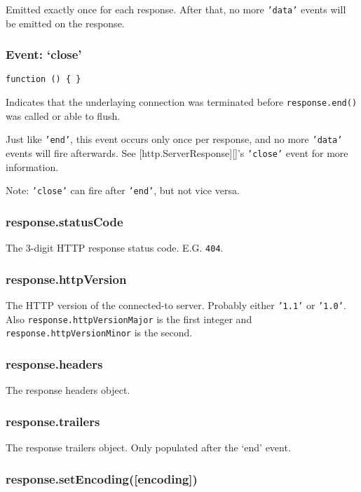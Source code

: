 Emitted exactly once for each response. After that, no more
\texttt{'data'} events will be emitted on the response.

\subsubsection{Event: `close'}

\texttt{function () \{ \}}

Indicates that the underlaying connection was terminated before
\texttt{response.end()} was called or able to flush.

Just like \texttt{'end'}, this event occurs only once per response, and
no more \texttt{'data'} events will fire afterwards. See
{[}http.ServerResponse{]}{[}{]}'s \texttt{'close'} event for more
information.

Note: \texttt{'close'} can fire after \texttt{'end'}, but not vice
versa.

\subsubsection{response.statusCode}

The 3-digit HTTP response status code. E.G. \texttt{404}.

\subsubsection{response.httpVersion}

The HTTP version of the connected-to server. Probably either
\texttt{'1.1'} or \texttt{'1.0'}. Also
\texttt{response.httpVersionMajor} is the first integer and
\texttt{response.httpVersionMinor} is the second.

\subsubsection{response.headers}

The response headers object.

\subsubsection{response.trailers}

The response trailers object. Only populated after the `end' event.

\subsubsection{response.setEncoding({[}encoding{]})}

